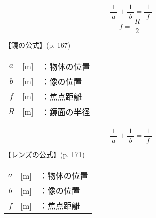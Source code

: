 \documentclass[10pt]{jarticle}
\begin{document}
\newpage





\[
\frac{1}{\; a \;} + \frac{1}{\; b \;} = \frac{1}{\; f \;}
\]
\[
f = \frac{\; R \;}{2}
\]


\vskip3mm
【鏡の公式】{\footnotesize (p. 167)}

\begin{tabular}{ccl}
$a$	&[m]	&：物体の位置\\
$b$	&[m]	&：像の位置\\
$f$	&[m]	&：焦点距離\\
$R$	&[m]	&：鏡面の半径\
\end{tabular}

\newpage





\[
\frac{1}{\; a \;} + \frac{1}{\; b \;} = \frac{1}{\; f \;}
\]


\vskip3mm
【レンズの公式】{\footnotesize (p. 171)}

\begin{tabular}{ccl}
$a$	&[m]	&：物体の位置\\
$b$	&[m]	&：像の位置\\
$f$	&[m]	&：焦点距離
\end{tabular}

\newpage
\end{document}
